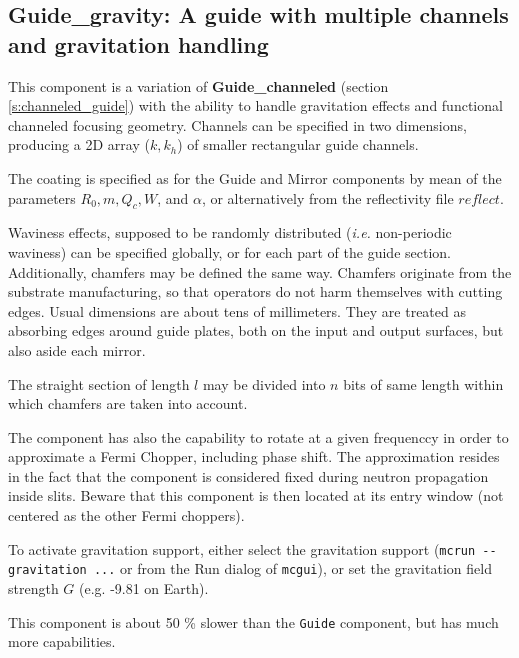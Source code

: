 \subsection*{Guide\_gravity: A guide with multiple channels and gravitation handling}
\label{s:guide_gravity}


This component is a variation of \textbf{Guide\_channeled}
(section \ref{s:channeled_guide}) with the ability to handle
gravitation effects and functional channeled focusing geometry.
Channels can be specified in two dimensions,
producing a 2D array ($k, k_h$) of smaller rectangular guide channels.

The coating is specified as for the Guide and Mirror components by mean of the parameters $R_0, m, Q_c, W$, and $\alpha$, or alternatively from the reflectivity file $reflect$.

Waviness effects, supposed to be randomly distributed
(\emph{i.e.} non-periodic waviness)
can be specified globally, or for each part of the guide section.
Additionally, chamfers
may be defined the same way.
Chamfers originate from the substrate manufacturing, so that operators do not harm themselves with cutting edges. Usual dimensions are about tens of millimeters. They are treated as absorbing edges around guide plates, both on the input and output surfaces, but also aside each mirror.

The straight section of length $l$ may be divided into $n$ bits of same length
within which chamfers are taken into account.

The component has also the capability to rotate at a given frequenccy in order to approximate a Fermi Chopper, including phase shift. The approximation resides in the fact that the component is considered fixed during neutron propagation inside slits. Beware that this component is then located at its entry window (not centered as the other Fermi choppers).

To activate gravitation support, either select the \MCS gravitation support (\verb+mcrun --gravitation ...+ or from the Run dialog of \verb+mcgui+),
or set the gravitation field strength $G$ (e.g. -9.81 on Earth).

This component is about 50 \% slower than the \verb+Guide+ component, but has much more capabilities.

